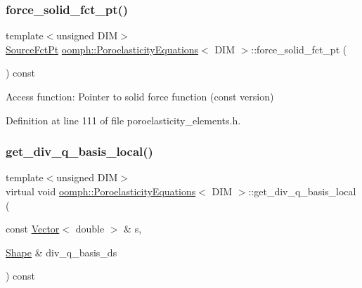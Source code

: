 \subsubsection{\texorpdfstring{force\+\_\+solid\+\_\+fct\+\_\+pt()}{force\_solid\_fct\_pt()}\hspace{0.1cm}{\footnotesize\ttfamily [2/2]}}
{\footnotesize\ttfamily template$<$unsigned D\+IM$>$ \\
\hyperlink{classoomph_1_1PoroelasticityEquations_a234bc29fbd4c3255ef903a3cb5f6361f}{Source\+Fct\+Pt} \hyperlink{classoomph_1_1PoroelasticityEquations}{oomph\+::\+Poroelasticity\+Equations}$<$ D\+IM $>$\+::force\+\_\+solid\+\_\+fct\+\_\+pt (\begin{DoxyParamCaption}{ }\end{DoxyParamCaption}) const\hspace{0.3cm}{\ttfamily [inline]}}



Access function\+: Pointer to solid force function (const version) 



Definition at line 111 of file poroelasticity\+\_\+elements.\+h.

\mbox{\label{classoomph_1_1PoroelasticityEquations_ae137222ce1c7904212ce34ad180123f8}} 
\subsubsection{\texorpdfstring{get\+\_\+div\+\_\+q\+\_\+basis\+\_\+local()}{get\_div\_q\_basis\_local()}}
{\footnotesize\ttfamily template$<$unsigned D\+IM$>$ \\
virtual void \hyperlink{classoomph_1_1PoroelasticityEquations}{oomph\+::\+Poroelasticity\+Equations}$<$ D\+IM $>$\+::get\+\_\+div\+\_\+q\+\_\+basis\+\_\+local (\begin{DoxyParamCaption}\item[{const \hyperlink{classoomph_1_1Vector}{Vector}$<$ double $>$ \&}]{s,  }\item[{\hyperlink{classoomph_1_1Shape}{Shape} \&}]{div\+\_\+q\+\_\+basis\+\_\+ds }\end{DoxyParamCaption}) const\hspace{0.3cm}{\ttfamily [pure virtual]}}



